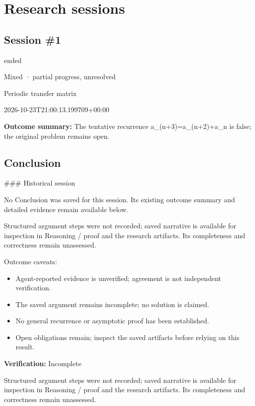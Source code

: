 \documentclass[11pt]{article}
\begin{document}
\section{Research sessions}
\subsection{Session \#1}
\begin{description}[style=nextline,font=\normalfont\bfseries,leftmargin=0pt,labelsep=0pt]
\item[Execution status] ended
\item[Outcome] Mixed · partial progress, unresolved
\item[Strategy] Periodic transfer matrix
\item[Started] 2026-10-23T21:00:13.199709+00:00
\end{description}
\textbf{Outcome summary:} The tentative recurrence a\_(n+3)=a\_(n+2)+a\_n is false; the original problem remains open.\par
\subsection{Conclusion}
\#\#\# Historical session

No Conclusion was saved for this session. Its existing outcome summary and detailed evidence remain available below.

Structured argument steps were not recorded; saved narrative is available for inspection in Reasoning / proof and the research artifacts. Its completeness and correctness remain unassessed.\par
Outcome caveats:\par
\begin{itemize}
\item Agent-reported evidence is unverified; agreement is not independent verification.
\item The saved argument remains incomplete; no solution is claimed.
\item No general recurrence or asymptotic proof has been established.
\item Open obligations remain; inspect the saved artifacts before relying on this result.
\end{itemize}
\textbf{Verification:} Incomplete\par
Structured argument steps were not recorded; saved narrative is available for inspection in Reasoning / proof and the research artifacts. Its completeness and correctness remain unassessed.\par
\end{document}
